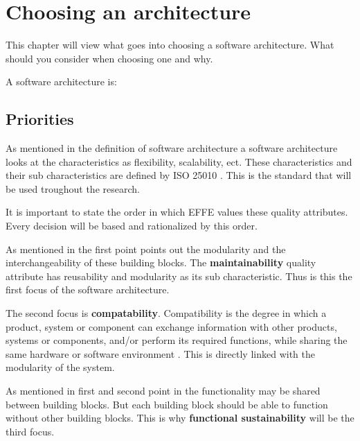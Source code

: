\chapter{Choosing an architecture}
\label{sec:ChoosingArchitecture}

This chapter will view what goes into choosing a software architecture. What should you consider when choosing one and why.

A software architecture is:


\section{Priorities}

As mentioned in the definition of software architecture  a software architecture looks at the characteristics as flexibility, scalability, ect. These characteristics and their sub characteristics are defined by ISO 25010 \cite{iso25010}. This is the standard that will be used troughout the research.

It is important to state the order in which EFFE values these quality attributes. Every decision will be based and rationalized by this order.

As mentioned in  the first point points out the modularity and the interchangeability of these building blocks. The \textbf{maintainability} quality attribute has reusability and modularity as its sub characteristic. Thus is this the first focus of the software architecture.

The second focus is \textbf{compatability}. Compatibility is the degree in which a product, system or component can exchange information with other products, systems or components, and/or perform its required functions, while sharing the same hardware or software environment \cite{iso25010}. This is directly linked with the modularity of the system.

As mentioned in first and second point in  the functionality may be shared between building blocks. But each building block should be able to function without other building blocks. This is why \textbf{functional sustainability} will be the third focus.

